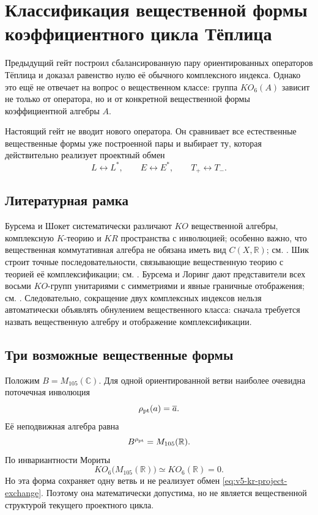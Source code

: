 \chapter{Классификация вещественной формы коэффициентного цикла Тёплица}

Предыдущий гейт построил сбалансированную пару ориентированных операторов
Тёплица и доказал равенство нулю её обычного комплексного индекса. Однако
это ещё не отвечает на вопрос о вещественном классе: группа $KO_6(A)$
зависит не только от оператора, но и от конкретной вещественной формы
коэффициентной алгебры $A$.

Настоящий гейт не вводит нового оператора. Он сравнивает все естественные
вещественные формы уже построенной пары и выбирает ту, которая действительно
реализует проектный обмен
\begin{equation}
 L\longleftrightarrow L^*,\qquad
 E\longleftrightarrow E^*,\qquad
 T_+\longleftrightarrow T_-.
 \label{eq:v5-kr-project-exchange}
\end{equation}

\section{Литературная рамка}

Бурсема и Шокет систематически различают $KO$ вещественной алгебры,
комплексную $K$-теорию и $KR$ пространства с инволюцией; особенно важно,
что вещественная коммутативная алгебра не обязана иметь вид
$C(X,\mathbb R)$; см. . Шик строит точные
последовательности, связывающие вещественную теорию с теорией её
комплексификации; см. . Бурсема и Лоринг дают
представители всех восьми $KO$-групп унитариями с симметриями и явные
граничные отображения; см. . Следовательно,
сокращение двух комплексных индексов нельзя автоматически объявлять
обнулением вещественного класса: сначала требуется назвать вещественную
алгебру и отображение комплексификации.

\section{Три возможные вещественные формы}

Положим $B=M_{105}(\mathbb C)$. Для одной ориентированной ветви наиболее
очевидна поточечная инволюция
\begin{equation}
 \rho_{\rm pt}(a)=\overline a.
\end{equation}
Её неподвижная алгебра равна
\begin{equation}
 B^{\rho_{\rm pt}}=M_{105}(\mathbb R).
\end{equation}
По инвариантности Мориты
\begin{equation}
 KO_6\bigl(M_{105}(\mathbb R)\bigr)
 \simeq KO_6(\mathbb R)=0.
 \label{eq:v5-kr-pointwise-zero}
\end{equation}
Но эта форма сохраняет одну ветвь и не реализует обмен
\eqref{eq:v5-kr-project-exchange}. Поэтому она математически допустима,
но не является вещественной структурой текущего проектного цикла.

